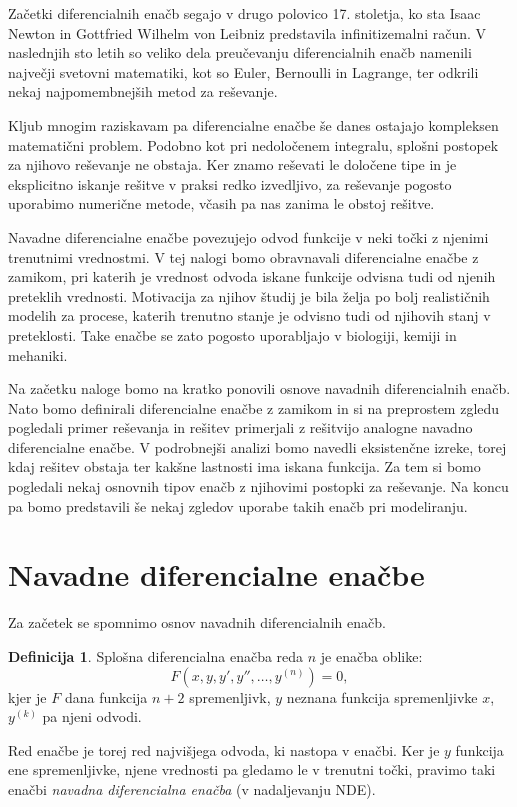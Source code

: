 \documentclass[12pt,a4paper]{amsart}
\theoremstyle{definition} %
\newtheorem{definicija}{Definicija}[section]
\theoremstyle{plain} %
\begin{document}
Začetki diferencialnih enačb segajo v drugo polovico 17. stoletja, ko sta Isaac Newton in Gottfried Wilhelm von 
Leibniz predstavila infinitizemalni račun. V naslednjih sto letih so veliko dela preučevanju diferencialnih
enačb namenili največji svetovni matematiki, kot so Euler, Bernoulli in Lagrange, ter odkrili nekaj najpomembnejših
metod za reševanje.

Kljub mnogim raziskavam pa diferencialne enačbe še danes ostajajo kompleksen matematični problem. Podobno kot pri
nedoločenem integralu, splošni postopek za njihovo reševanje ne obstaja. Ker znamo reševati le določene tipe in je
eksplicitno iskanje rešitve v praksi redko izvedljivo, za reševanje pogosto uporabimo numerične metode,
včasih pa nas zanima le obstoj rešitve.

Navadne diferencialne enačbe povezujejo odvod funkcije v neki točki z njenimi trenutnimi vrednostmi.
V tej nalogi bomo obravnavali diferencialne enačbe z zamikom, pri katerih je vrednost odvoda iskane funkcije odvisna
tudi od njenih preteklih vrednosti. Motivacija za njihov študij je bila želja po bolj realističnih modelih za procese, 
katerih trenutno stanje je odvisno tudi od njihovih stanj v preteklosti. Take enačbe se zato pogosto uporabljajo
v biologiji, kemiji in mehaniki.

Na začetku naloge bomo na kratko ponovili osnove navadnih diferencialnih enačb. Nato bomo definirali
diferencialne enačbe z zamikom in si na preprostem zgledu pogledali primer reševanja in rešitev primerjali z 
rešitvijo analogne navadno diferencialne enačbe. V podrobnejši analizi bomo navedli eksistenčne izreke, torej kdaj 
rešitev obstaja ter kakšne lastnosti ima iskana funkcija. Za tem si bomo pogledali nekaj osnovnih tipov enačb z 
njihovimi postopki za reševanje. Na koncu pa bomo predstavili še nekaj zgledov uporabe takih enačb pri modeliranju.


\section{Navadne diferencialne enačbe}

Za začetek se spomnimo osnov navadnih diferencialnih enačb.

\begin{definicija}
    Splošna diferencialna enačba reda $n$ je enačba oblike:
    \[F(x,y,y',y'',\dots,y^{(n)})=0,\]
    kjer je $F$ dana funkcija $n+2$ spremenljivk, $y$ neznana funkcija spremenljivke $x$, $y^{(k)}$ pa njeni
    odvodi.
\end{definicija}
Red enačbe je torej red najvišjega odvoda, ki nastopa v enačbi. Ker je $y$ funkcija ene spremenljivke,
njene vrednosti pa gledamo le v trenutni točki, pravimo taki enačbi \emph{navadna diferencialna enačba} (v
nadaljevanju NDE).
\end{document}
